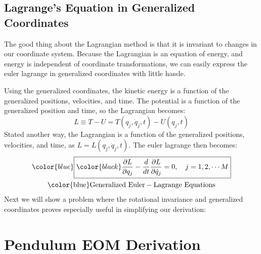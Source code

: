 \subsection{Lagrange's Equation in Generalized Coordinates}

The good thing about the \gls{Lagrangian} method is that it is invariant to changes in our coordinate system. Because the \gls{Lagrangian} is an equation of energy, and energy is independent of coordinate transformations, we can easily express the \gls{euler lagrange} in generalized coordinates with little hassle. 

Using the generalized coordinates, the kinetic energy is a function of the generalized positions, velocities, and time. The potential is a function of the generalized position and time, so the \gls{Lagrangian} becomes:
$$L\equiv T-U=T(q_j,\dot{q}_j,t)-U(q_j,t)$$
Stated another way, the \gls{Lagrangian} is a function of the generalized positions, velocities, and time, as $L=L(q_j,\dot{q}_j,t)$. The \gls{euler lagrange} then becomes:
\begin{gather}\label{eq:Euler-Lagrange General}
\color{blue}\boxed{\color{black}\frac{\partial L}{\partial q_j}-\frac{d}{dt}\frac{\partial L}{\partial \dot{q}_j}=0,\quad j=1,2,\cdots M}\\
\mathrm{\color{blue}Generalized \ Euler-Lagrange \ Equations}
\end{gather}
Next we will show a problem where the rotational invariance and generalized coordinates proves especially useful in simplifying our derivation:
\section{Pendulum EOM Derivation}
